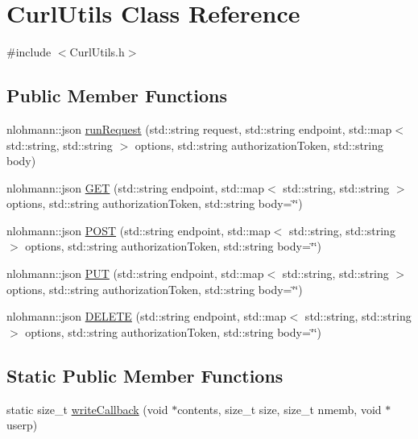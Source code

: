 \hypertarget{class_curl_utils}{}\section{Curl\+Utils Class Reference}
\label{class_curl_utils}


{\ttfamily \#include $<$Curl\+Utils.\+h$>$}

\subsection*{Public Member Functions}
\begin{DoxyCompactItemize}
\item 
nlohmann\+::json \mbox{\hyperlink{class_curl_utils_a596d1f41d3e300c4c626b4e4f819c194}{run\+Request}} (std\+::string request, std\+::string endpoint, std\+::map$<$ std\+::string, std\+::string $>$ options, std\+::string authorization\+Token, std\+::string body)
\item 
nlohmann\+::json \mbox{\hyperlink{class_curl_utils_ac500280637c99900b1f1e64d5be58733}{G\+ET}} (std\+::string endpoint, std\+::map$<$ std\+::string, std\+::string $>$ options, std\+::string authorization\+Token, std\+::string body=\char`\"{}\char`\"{})
\item 
nlohmann\+::json \mbox{\hyperlink{class_curl_utils_ad923cee3ef19b5d7944f68ffb50b2fb3}{P\+O\+ST}} (std\+::string endpoint, std\+::map$<$ std\+::string, std\+::string $>$ options, std\+::string authorization\+Token, std\+::string body=\char`\"{}\char`\"{})
\item 
nlohmann\+::json \mbox{\hyperlink{class_curl_utils_a3b852e68c1c552950944c512712a3620}{P\+UT}} (std\+::string endpoint, std\+::map$<$ std\+::string, std\+::string $>$ options, std\+::string authorization\+Token, std\+::string body=\char`\"{}\char`\"{})
\item 
nlohmann\+::json \mbox{\hyperlink{class_curl_utils_aa78fe6e8b55d787002b7089e70473558}{D\+E\+L\+E\+TE}} (std\+::string endpoint, std\+::map$<$ std\+::string, std\+::string $>$ options, std\+::string authorization\+Token, std\+::string body=\char`\"{}\char`\"{})
\end{DoxyCompactItemize}
\subsection*{Static Public Member Functions}
\begin{DoxyCompactItemize}
\item 
static size\+\_\+t \mbox{\hyperlink{class_curl_utils_a1e068c580af8fc71663e220c6b2128c3}{write\+Callback}} (void $\ast$contents, size\+\_\+t size, size\+\_\+t nmemb, void $\ast$userp)
\end{DoxyCompactItemize}
